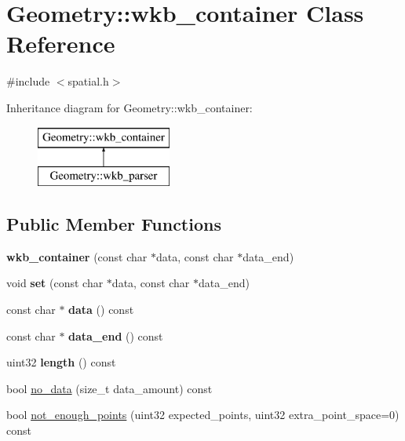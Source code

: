 \hypertarget{classGeometry_1_1wkb__container}{}\section{Geometry\+:\+:wkb\+\_\+container Class Reference}
\label{classGeometry_1_1wkb__container}


{\ttfamily \#include $<$spatial.\+h$>$}

Inheritance diagram for Geometry\+:\+:wkb\+\_\+container\+:\begin{figure}[H]
\begin{center}
\leavevmode
\includegraphics[height=2.000000cm]{classGeometry_1_1wkb__container}
\end{center}
\end{figure}
\subsection*{Public Member Functions}
\begin{DoxyCompactItemize}
\item 
\mbox{\label{classGeometry_1_1wkb__container_a70578b34b394b41a8bd8ebe802729a26}} 
{\bfseries wkb\+\_\+container} (const char $\ast$data, const char $\ast$data\+\_\+end)
\item 
\mbox{\label{classGeometry_1_1wkb__container_a7c0a755441113338aab97737ce77da48}} 
void {\bfseries set} (const char $\ast$data, const char $\ast$data\+\_\+end)
\item 
\mbox{\label{classGeometry_1_1wkb__container_a83c40a274805f32bc54fafa276843c1b}} 
const char $\ast$ {\bfseries data} () const
\item 
\mbox{\label{classGeometry_1_1wkb__container_adc1887c73ce75eba44eddc92b6b2b7bb}} 
const char $\ast$ {\bfseries data\+\_\+end} () const
\item 
\mbox{\label{classGeometry_1_1wkb__container_a37a20d0ff30547670be205c19257a5ab}} 
uint32 {\bfseries length} () const
\item 
bool \mbox{\hyperlink{classGeometry_1_1wkb__container_a77f40e16781fab23d33966364f3836a2}{no\+\_\+data}} (size\+\_\+t data\+\_\+amount) const
\item 
bool \mbox{\hyperlink{classGeometry_1_1wkb__container_adc7224d1d02516ae57eb5fee366e6a5f}{not\+\_\+enough\+\_\+points}} (uint32 expected\+\_\+points, uint32 extra\+\_\+point\+\_\+space=0) const
\end{DoxyCompactItemize}

